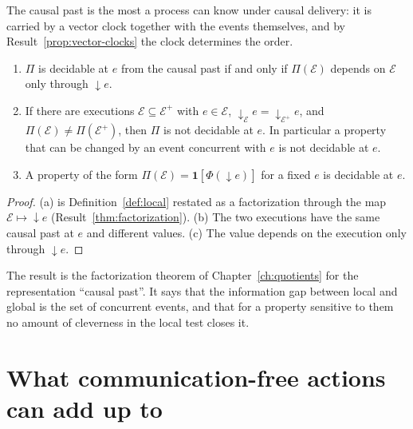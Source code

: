 The causal past is the most a process can know under causal delivery: it is carried by a vector clock together with the events themselves, and by Result~\ref{prop:vector-clocks} the clock determines the order.

\begin{newresult}\label{prop:local-decidable}
\begin{enumerate}[nosep,label=(\alph*)]
  \item $\Pi$ is decidable at $e$ from the causal past if and only if $\Pi(\mathcal E)$ depends on $\mathcal E$ only through $\downarrow e$.
  \item If there are executions $\mathcal E\subseteq\mathcal E^{+}$ with $e\in\mathcal E$, $\downarrow_{\mathcal E}e=\downarrow_{\mathcal E^{+}}e$, and $\Pi(\mathcal E)\ne\Pi(\mathcal E^{+})$, then $\Pi$ is not decidable at $e$. In particular a property that can be changed by an event concurrent with $e$ is not decidable at $e$.
  \item A property of the form $\Pi(\mathcal E)=\mathbf 1[\Phi(\downarrow e)]$ for a fixed $e$ is decidable at $e$.
\end{enumerate}
\end{newresult}
\begin{proof}
(a) is Definition~\ref{def:local} restated as a factorization through the map $\mathcal E\mapsto\downarrow e$ (Result~\ref{thm:factorization}). (b) The two executions have the same causal past at $e$ and different values. (c) The value depends on the execution only through $\downarrow e$.
\end{proof}

The result is the factorization theorem of Chapter~\ref{ch:quotients} for the representation ``causal past''. It says that the information gap between local and global is the set of concurrent events, and that for a property sensitive to them no amount of cleverness in the local test closes it.

\section{What communication-free actions can add up to}

